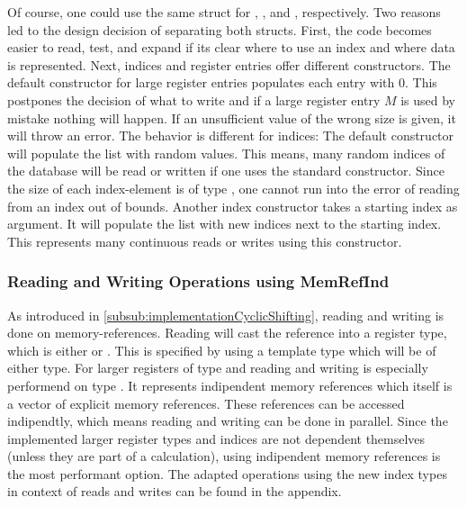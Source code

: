 Of course, one could use the same struct for , , and ,  respectively.
Two reasons led to the design decision of separating both structs.
First, the code becomes easier to read, test, and expand if its clear where to use an index and where data is represented.
Next, indices and register entries offer different constructors.
The default constructor for large register entries populates each entry with $0$.
This postpones the decision of what to write and if a large register entry $M$ is used by mistake nothing will happen.
If an unsufficient value of the wrong size is given, it will throw an error.
The behavior is different for indices:
The default constructor will populate the list with random values.
This means,  many random indices of the database will be read or written if one uses the standard constructor.
Since the size of each index-element is of type , one cannot run into the error of reading from an index out of bounds.
Another index constructor takes a starting index as argument.
It will populate the list with  new indices next to the starting index.
This represents  many continuous reads or writes using this constructor.

\subsubsection*{Reading and Writing Operations using MemRefInd} \label{subsub:ReadingWritingUsingMemRefInd} 
As introduced in \ref{subsub:implementationCyclicShifting}, reading and writing is done on memory-references.
Reading will cast the reference into a register type, which is either  or .
This is specified by using a template type  which will be of either type.
For larger registers of type  and  reading and writing is especially performend on type .
It represents indipendent memory references which itself is a vector of explicit memory references.
These references can be accessed indipendtly, which means reading and writing can be done in parallel.
Since the implemented larger register types and indices are not dependent themselves (unless they are part of a calculation), using indipendent memory references is the most performant option.
The adapted operations using the new index types in context of reads and writes can be found in the appendix. %

